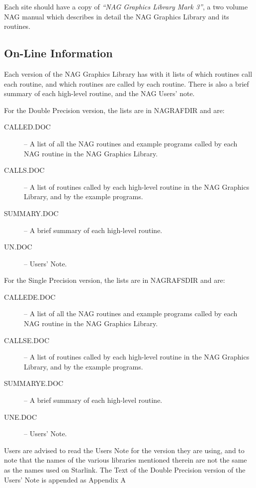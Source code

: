 Each site should have a copy of {\em ``NAG Graphics Library Mark 3''\/}, a two
volume NAG manual which describes in detail the NAG Graphics Library and its
routines.

\subsection{On-Line Information}

Each version of the NAG Graphics Library has with it lists of which routines
call each routine, and which routines are called by each routine. There is also
a brief summary of each high-level routine, and the NAG Users' note.

For the Double Precision version, the lists are in NAGRAFDIR and are:
\begin{description}
\begin{description}
\item[CALLED.DOC] -- A list of all the NAG routines and example programs called
by each NAG routine in the NAG Graphics Library.
\item[CALLS.DOC] -- A list of routines called by each high-level routine in the
NAG Graphics Library, and by the example programs.
\item[SUMMARY.DOC] -- A brief summary of each high-level routine.
\item[UN.DOC] -- Users' Note.
\end{description}
\end{description}

For the Single Precision version, the lists are in NAGRAFSDIR and are:
\begin{description}
\begin{description}
\item[CALLEDE.DOC] -- A list of all the NAG routines and example programs called
by each NAG routine in the NAG Graphics Library.
\item[CALLSE.DOC] -- A list of routines called by each high-level routine in the
NAG Graphics Library, and by the example programs.
\item[SUMMARYE.DOC] -- A brief summary of each high-level routine.
\item[UNE.DOC] -- Users' Note.
\end{description}
\end{description}

Users are advised to read the Users Note for the version they are using, and to
note that the names of the various libraries mentioned therein are not the same
as the names used on Starlink. The Text of the Double Precision version of the
Users' Note is appended as Appendix A

